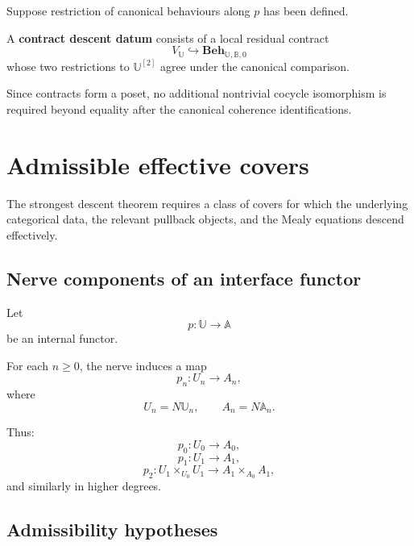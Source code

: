 Suppose restriction of canonical behaviours along \(p\) has been defined.

\begin{definition}
\label{def:contract-descent-datum}
A \textbf{contract descent datum} consists of a local residual contract
\[
    V_{\mathbb U}
    \hookrightarrow
    \mathbf{Beh}_{\mathbb U,\mathbb B,0}
\]
whose two restrictions to \(\mathbb U^{[2]}\) agree under the canonical
comparison.
\end{definition}

Since contracts form a poset, no additional nontrivial cocycle isomorphism is
required beyond equality after the canonical coherence identifications.

\section{Admissible effective covers}
\label{sec:admissible-effective-covers}

The strongest descent theorem requires a class of covers for which the
underlying categorical data, the relevant pullback objects, and the Mealy
equations descend effectively.

\subsection{Nerve components of an interface functor}
\label{subsec:nerve-components-interface-functor}

Let
\[
    p:\mathbb U\to\mathbb A
\]
be an internal functor.

For each \(n\geq 0\), the nerve induces a map
\[
    p_n:
    U_n\to A_n,
\]
where
\[
    U_n=N\mathbb U_n,
    \qquad
    A_n=N\mathbb A_n.
\]

Thus:
\[
    p_0:U_0\to A_0,
\]
\[
    p_1:U_1\to A_1,
\]
\[
    p_2:
    U_1\times_{U_0}U_1
    \to
    A_1\times_{A_0}A_1,
\]
and similarly in higher degrees.

\subsection{Admissibility hypotheses}
\label{subsec:admissibility-hypotheses}

